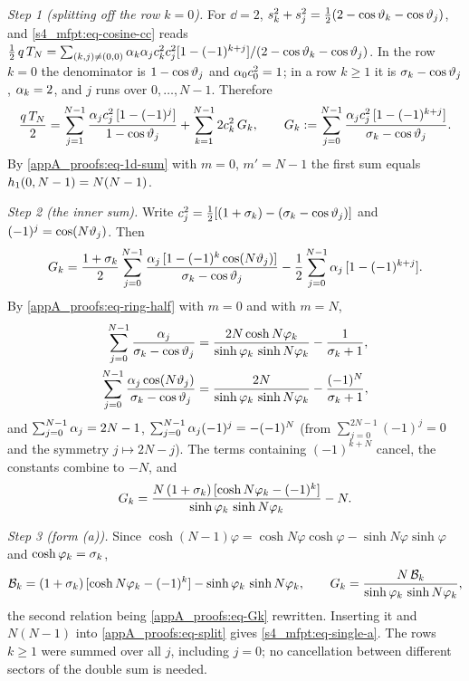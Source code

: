 \emph{Step 1 (splitting off the row $k=0$).} For $\dd=2$, $s_{k}^{2}+s_{j}^{2}=\tfrac12(2-\cos\vartheta_{k}-\cos\vartheta_{j})$,
and \eqref{s4_mfpt:eq-cosine-cc} reads
$\tfrac12\,q\,T_{N}=\sum_{(k,j)\ne(0,0)}\alpha_{k}\alpha_{j}c_{k}^{2}c_{j}^{2}[1-(-1)^{k+j}]/(2-\cos\vartheta_{k}-\cos\vartheta_{j})$.
In the row $k=0$ the denominator is $1-\cos\vartheta_{j}$ and $\alpha_{0}c_{0}^{2}=1$; in a row $k\ge1$ it is
$\sigma_{k}-\cos\vartheta_{j}$, $\alpha_{k}=2$, and $j$ runs over $0,\dots,N-1$. Therefore
\begin{equation}\label{appA_proofs:eq-split}
  \frac{q\,T_{N}}{2}=\sum_{j=1}^{N-1}\frac{\alpha_{j}c_{j}^{2}\,[1-(-1)^{j}]}{1-\cos\vartheta_{j}}+\sum_{k=1}^{N-1}2c_{k}^{2}\,G_k,
  \qquad
  G_k:=\sum_{j=0}^{N-1}\frac{\alpha_{j}c_{j}^{2}\,[1-(-1)^{k+j}]}{\sigma_{k}-\cos\vartheta_{j}} .
\end{equation}
By \eqref{appA_proofs:eq-1d-sum} with $m=0$, $m'=N-1$ the first sum equals $h_{1}(0,N-1)=N(N-1)$.

\emph{Step 2 (the inner sum).} Write $c_{j}^{2}=\tfrac12[(1+\sigma_{k})-(\sigma_{k}-\cos\vartheta_{j})]$ and
$(-1)^{j}=\cos(N\vartheta_{j})$. Then
\[
  G_k=\frac{1+\sigma_{k}}{2}\sum_{j=0}^{N-1}\frac{\alpha_{j}\,[1-(-1)^{k}\cos(N\vartheta_{j})]}{\sigma_{k}-\cos\vartheta_{j}}
  -\frac12\sum_{j=0}^{N-1}\alpha_{j}\,[1-(-1)^{k+j}] .
\]
By \eqref{appA_proofs:eq-ring-half} with $m=0$ and with $m=N$,
\begin{align*}
  \sum_{j=0}^{N-1}\frac{\alpha_{j}}{\sigma_{k}-\cos\vartheta_{j}}&=\frac{2N\cosh N\varphi_{k}}{\sinh\varphi_{k}\,\sinh N\varphi_{k}}-\frac{1}{\sigma_{k}+1},\\
  \sum_{j=0}^{N-1}\frac{\alpha_{j}\cos(N\vartheta_{j})}{\sigma_{k}-\cos\vartheta_{j}}&=\frac{2N}{\sinh\varphi_{k}\,\sinh N\varphi_{k}}-\frac{(-1)^{N}}{\sigma_{k}+1},
\end{align*}
and $\sum_{j=0}^{N-1}\alpha_{j}=2N-1$, $\sum_{j=0}^{N-1}\alpha_{j}(-1)^{j}=-(-1)^{N}$ (from
$\sum_{j=0}^{2N-1}(-1)^{j}=0$ and the symmetry $j\mapsto2N-j$). The terms containing $(-1)^{k+N}$ cancel, the
constants combine to $-N$, and
\begin{equation}\label{appA_proofs:eq-Gk}
  G_k=\frac{N\,(1+\sigma_{k})\,[\cosh N\varphi_{k}-(-1)^{k}]}{\sinh\varphi_{k}\,\sinh N\varphi_{k}}-N .
\end{equation}

\emph{Step 3 (form (a)).} Since $\cosh(N-1)\varphi=\cosh N\varphi\cosh\varphi-\sinh N\varphi\sinh\varphi$ and
$\cosh\varphi_{k}=\sigma_{k}$,
\begin{equation}\label{appA_proofs:eq-Bk}
  \mathcal{B}_{k}=(1+\sigma_{k})\,[\cosh N\varphi_{k}-(-1)^{k}]-\sinh\varphi_{k}\,\sinh N\varphi_{k},
  \qquad G_k=\frac{N\,\mathcal{B}_{k}}{\sinh\varphi_{k}\,\sinh N\varphi_{k}} ,
\end{equation}
the second relation being \eqref{appA_proofs:eq-Gk} rewritten. Inserting it and $N(N-1)$ into \eqref{appA_proofs:eq-split} gives \eqref{s4_mfpt:eq-single-a}. The rows
$k\ge1$ were summed over all $j$, including $j=0$; no cancellation between different sectors of the double sum is
needed.


